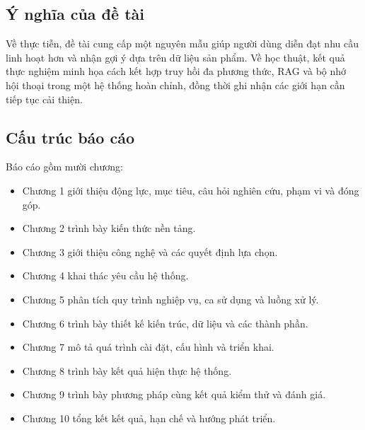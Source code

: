 \subsection{Ý nghĩa của đề tài}
\indent Về thực tiễn, đề tài cung cấp một nguyên mẫu giúp người dùng diễn đạt nhu cầu linh hoạt hơn và nhận gợi ý dựa trên dữ liệu sản phẩm. Về học thuật, kết quả thực nghiệm minh họa cách kết hợp truy hồi đa phương thức, RAG và bộ nhớ hội thoại trong một hệ thống hoàn chỉnh, đồng thời ghi nhận các giới hạn cần tiếp tục cải thiện.

\subsection{Cấu trúc báo cáo}
\indent Báo cáo gồm mười chương:
\begin{itemize}
    \item Chương 1 giới thiệu động lực, mục tiêu, câu hỏi nghiên cứu, phạm vi và đóng góp.
    \item Chương 2 trình bày kiến thức nền tảng.
    \item Chương 3 giới thiệu công nghệ và các quyết định lựa chọn.
    \item Chương 4 khai thác yêu cầu hệ thống.
    \item Chương 5 phân tích quy trình nghiệp vụ, ca sử dụng và luồng xử lý.
    \item Chương 6 trình bày thiết kế kiến trúc, dữ liệu và các thành phần.
    \item Chương 7 mô tả quá trình cài đặt, cấu hình và triển khai.
    \item Chương 8 trình bày kết quả hiện thực hệ thống.
    \item Chương 9 trình bày phương pháp cùng kết quả kiểm thử và đánh giá.
    \item Chương 10 tổng kết kết quả, hạn chế và hướng phát triển.
\end{itemize}
